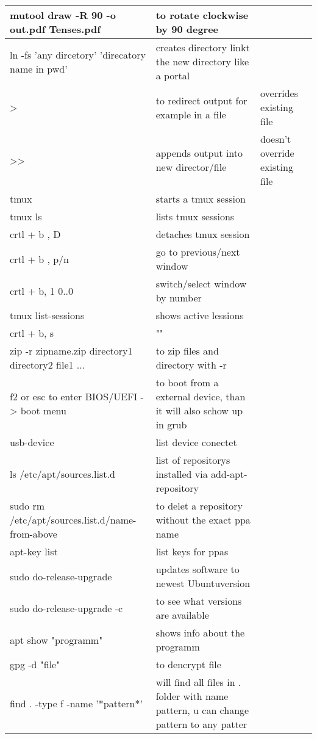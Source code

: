 \documentclass[12pt]{article}
\begin{document}
\begin{tabular}{| p{6.5cm} | p{6.5cm} | p{6.5cm} |}
    mutool draw -R 90 -o out.pdf Tenses.pdf & to rotate clockwise by 90 degree &\\
    \hline 
    ln -fs 'any dircetory' 'direcatory name in pwd' & creates directory linkt the new directory like a portal & \\
    \hline 
    > & to redirect output for example in a file & overrides existing file \\
    \hline
    >> & appends output into new director/file & doesn't override existing file \\
    \hline
    tmux & starts a tmux session &\\
    \hline
    tmux ls & lists tmux sessions & \\
    \hline 
    crtl + b , D & detaches tmux session &\\
    \hline
    crtl + b , p/n & go to previous/next window & \\
    \hline
    crtl + b, 1 0..0 & switch/select window by number & \\
    \hline
    tmux list-sessions & shows active lessions & \\
    \hline
    crtl + b, s & "" & \\
    \hline
    zip -r zipname.zip directory1 directory2 file1 ... & to zip files and directory with -r & \\
    \hline
    f2 or esc to enter BIOS/UEFI -> boot menu & to boot from a external device, than it will also schow up in grub &\\
    \hline 
    usb-device & list device conectet &\\
    \hline
    ls /etc/apt/sources.list.d & list of repositorys installed via add-apt-repository & \\
    \hline
    sudo rm /etc/apt/sources.list.d/name- from-above & to delet a repository without the exact ppa name &\\
    \hline
    apt-key list & list keys for ppas &\\
    \hline
    sudo do-release-upgrade & updates software to newest Ubuntuversion &\\
    \hline 
    sudo do-release-upgrade -c & to see what versions are available &\\
    \hline
    apt show "programm" & shows info about the programm &\\
    \hline
    gpg -d "file" & to dencrypt file &\\
    \hline 
    find . -type f -name '*pattern*' & will find all files in . folder with name pattern, u can change pattern to any patter &\\

\end{tabular}
\end{document}
